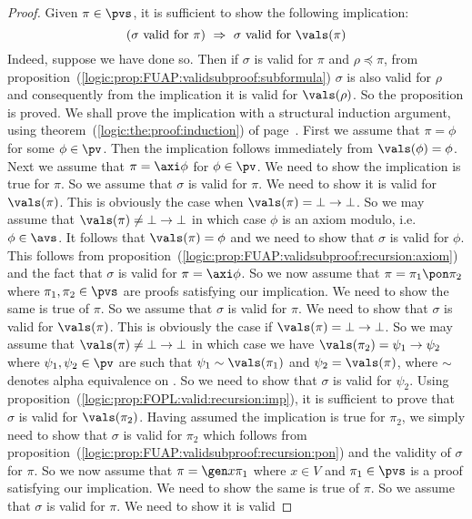 \begin{proof}
Given $\pi\in\pvs$, it is sufficient to show the following
implication:
    \[
    (\mbox{$\sigma$ valid for $\pi$})\ \Rightarrow\ \mbox{$\sigma$ valid for
    $\vals(\pi)$}
    \]
Indeed, suppose we have done so. Then if $\sigma$ is valid for $\pi$
and $\rho\preceq\pi$, from
proposition~(\ref{logic:prop:FUAP:validsubproof:subformula})
$\sigma$ is also valid for $\rho$ and consequently from the
implication it is valid for $\vals(\rho)$. So the proposition is
proved. We shall prove the implication with a structural induction
argument, using theorem~(\ref{logic:the:proof:induction}) of
page~\pageref{logic:the:proof:induction}. First we assume that
$\pi=\phi$ for some $\phi\in\pv$. Then the implication follows
immediately from $\vals(\phi)=\phi$. Next we assume that
$\pi=\axi\phi$ for $\phi\in\pv$. We need to show the implication is
true for $\pi$. So we assume that $\sigma$ is valid for $\pi$. We
need to show it is valid for $\vals(\pi)$. This is obviously the
case when $\vals(\pi)=\bot\to\bot$. So we may assume that
$\vals(\pi)\neq\bot\to\bot$ in which case $\phi$ is an axiom modulo,
i.e. $\phi\in\avs$. It follows that $\vals(\pi)=\phi$ and we need to
show that $\sigma$ is valid for $\phi$. This follows from
proposition~(\ref{logic:prop:FUAP:validsubproof:recursion:axiom})
and the fact that $\sigma$ is valid for $\pi=\axi\phi$. So we now
assume that $\pi=\pi_{1}\pon\pi_{2}$ where $\pi_{1},\pi_{2}\in\pvs$
are proofs satisfying our implication. We need to show the same is
true of $\pi$. So we assume that $\sigma$ is valid for $\pi$. We
need to show that $\sigma$ is valid for $\vals(\pi)$. This is
obviously the case if $\vals(\pi)=\bot\to\bot$. So we may assume
that $\vals(\pi)\neq\bot\to\bot$ in which case we have
$\vals(\pi_{2})=\psi_{1}\to\psi_{2}$ where $\psi_{1},\psi_{2}\in\pv$
are such that $\psi_{1}\sim\vals(\pi_{1})$ and
$\psi_{2}=\vals(\pi)$, where $\sim$ denotes alpha equivalence
on \pv. So we need to show that $\sigma$ is valid for $\psi_{2}$.
Using proposition~(\ref{logic:prop:FOPL:valid:recursion:imp}), it is
sufficient to prove that $\sigma$ is valid for $\vals(\pi_{2})$.
Having assumed the implication is true for $\pi_{2}$, we simply need
to show that $\sigma$ is valid for $\pi_{2}$ which follows from
proposition~(\ref{logic:prop:FUAP:validsubproof:recursion:pon}) and
the validity of $\sigma$ for $\pi$. So we now assume that $\pi=\gen
x\pi_{1}$ where $x\in V$ and $\pi_{1}\in\pvs$ is a proof satisfying
our implication. We need to show the same is true of $\pi$. So we
assume that $\sigma$ is valid for $\pi$. We need to show it is valid

\end{proof}
